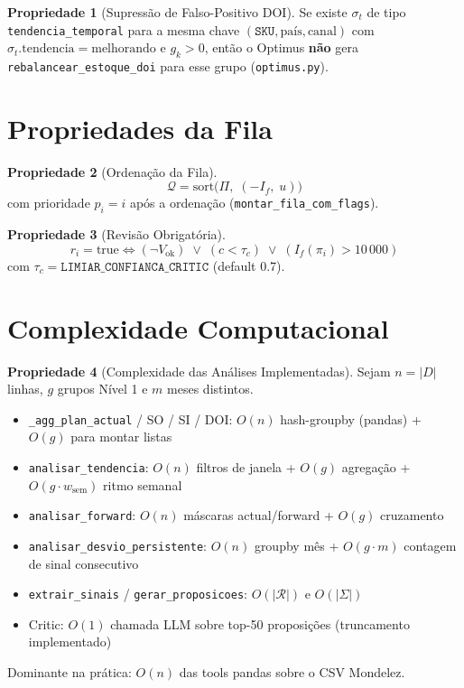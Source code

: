 \documentclass[a4paper, 12pt]{report}
\theoremstyle{definition}
\newtheorem{propriedade}{Propriedade}[chapter]
\theoremstyle{remark}
\newcommand{\sku}{\texttt{SKU}}
\newcommand{\fila}{\mathcal{Q}}
\begin{document}
\begin{propriedade}[Supress\~ao de Falso-Positivo DOI]
  Se existe $\sigma_t$ de tipo \texttt{tendencia\_temporal} para a
  mesma chave $(\sku, \text{pa\'is}, \text{canal})$ com
  $\sigma_t.\text{tendencia}=\text{melhorando}$ e $g_k > 0$, ent\~ao
  o Optimus \textbf{n\~ao} gera
  \texttt{rebalancear\_estoque\_doi} para esse grupo
  (\texttt{optimus.py}).
\end{propriedade}


\section{Propriedades da Fila}

\begin{propriedade}[Ordena\c{c}\~ao da Fila]
  \[
    \fila = \text{sort}\bigl(\Pi,\; (-I_f,\; u)\bigr)
  \]
  com prioridade $p_i = i$ ap\'os a ordena\c{c}\~ao
  (\texttt{montar\_fila\_com\_flags}).
\end{propriedade}

\begin{propriedade}[Revis\~ao Obrigat\'oria]
  \[
    r_i = \text{true} \iff
    (\neg V_{\text{ok}})
    \;\lor\;
    (c < \tau_c)
    \;\lor\;
    (I_f(\pi_i) > 10\,000)
  \]
  com $\tau_c = \texttt{LIMIAR\_CONFIANCA\_CRITIC}$ (default 0.7).
\end{propriedade}


\section{Complexidade Computacional}

\begin{propriedade}[Complexidade das An\'alises Implementadas]
  Sejam $n = |D|$ linhas, $g$ grupos N\'ivel 1 e $m$ meses distintos.
  \begin{itemize}
    \item \texttt{\_agg\_plan\_actual} / SO / SI / DOI: $O(n)$ hash-groupby
      (pandas) + $O(g)$ para montar listas
    \item \texttt{analisar\_tendencia}: $O(n)$ filtros de janela +
      $O(g)$ agrega\c{c}\~ao + $O(g \cdot w_{\text{sem}})$ ritmo semanal
    \item \texttt{analisar\_forward}: $O(n)$ m\'ascaras actual/forward +
      $O(g)$ cruzamento
    \item \texttt{analisar\_desvio\_persistente}: $O(n)$ groupby m\^es +
      $O(g \cdot m)$ contagem de sinal consecutivo
    \item \texttt{extrair\_sinais} / \texttt{gerar\_proposicoes}:
      $O(|\mathcal{R}|)$ e $O(|\Sigma|)$
    \item Critic: $O(1)$ chamada LLM sobre top-50 proposi\c{c}\~oes
      (truncamento implementado)
  \end{itemize}
  Dominante na pr\'atica: $O(n)$ das tools pandas sobre o CSV Mondelez.
\end{propriedade}
\end{document}
